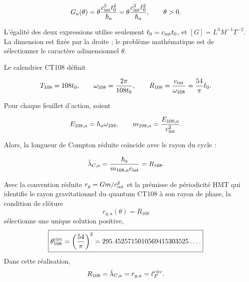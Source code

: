 \begin{equation}
\label{rm:eq:gravity-transducer}
G_a(\theta)
=\theta\frac{c_{\rm int}^{5}t_0^2}{\hbar_a}
=\theta\frac{c_{\rm int}^{3}\ell_0^2}{\hbar_a},
\qquad \theta>0.
\end{equation}

L'égalité des deux expressions utilise seulement
\(\ell_0=c_{\rm int}t_0\), et
\([G]=L^3M^{-1}T^{-2}\). La dimension est fixée par la droite ; le
problème mathématique est de sélectionner le caractère adimensionnel \(\theta\).

Le calendrier CT108 définit

\begin{equation}
\label{rm:eq:gravity-clock108}
T_{108}=108t_0,
\qquad
\omega_{108}=\frac{2\pi}{108t_0},
\qquad
R_{108}=\frac{c_{\rm int}}{\omega_{108}}
=\frac{54}{\pi}\ell_0.
\end{equation}

Pour chaque feuillet d'action, soient

\begin{equation}
\label{rm:eq:gravity-clock-energy-mass}
E_{108,a}=\hbar_a\omega_{108},
\qquad
m_{108,a}=\frac{E_{108,a}}{c_{\rm int}^2}.
\end{equation}

Alors, la longueur de Compton réduite coïncide avec le rayon du cycle :

\begin{equation}
\label{rm:eq:gravity-compton-clock}
\bar\lambda_{C,a}
=\frac{\hbar_a}{m_{108,a}c_{\rm int}}
=R_{108}.
\end{equation}

\begin{theorem}
\label{rm:thm:gravity-circular-selector}
Avec la convention réduite
\(r_g=Gm/c_{\rm int}^2\) et la prémisse de périodicité HMT qui identifie le rayon
gravitationnel du quantum CT108 à son rayon de phase, la condition de clôture
\begin{equation}
\label{rm:eq:gravity-closing-condition}
r_{g,a}(\theta)=R_{108}
\end{equation}
sélectionne une unique solution positive,
\begin{equation}
\label{rm:eq:gravity-theta108}
\boxed{
\theta_{108}^{\rm circ}=\left(\frac{54}{\pi}\right)^2
=295.4525715010569415303525\ldots .}
\end{equation}
Dans cette réalisation,
\begin{equation}
\label{rm:eq:gravity-four-lengths}
R_{108}=\bar\lambda_{C,a}=r_{g,a}=\ell_P^{\rm circ}.
\end{equation}
\end{theorem}

